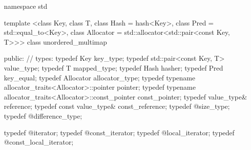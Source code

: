%
\begin{codeblock}
namespace std {
  template <class Key,
            class T,
            class Hash = hash<Key>,
            class Pred = std::equal_to<Key>,
            class Allocator = std::allocator<std::pair<const Key, T>>>
  class unordered_multimap {
  public:
    // types:
    typedef Key                                                 key_type;
    typedef std::pair<const Key, T>                             value_type;
    typedef T                                                   mapped_type;
    typedef Hash                                                hasher;
    typedef Pred                                                key_equal;
    typedef Allocator                                           allocator_type;
    typedef typename allocator_traits<Allocator>::pointer       pointer;
    typedef typename allocator_traits<Allocator>::const_pointer const_pointer;
    typedef value_type&                                         reference;
    typedef const value_type&                                   const_reference;
    typedef @\impdefnc@                              size_type;
    typedef @\impdefnc@                              difference_type;

    typedef @\impdefnc@                              iterator;
    typedef @\impdefnc@                              const_iterator;
    typedef @\impdefnc@                              local_iterator;
    typedef @\impdefnc@                              const_local_iterator;

}}
\end{codeblock}
